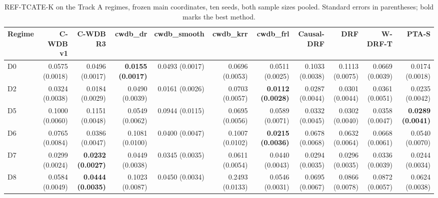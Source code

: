 \begin{table}[htbp]
\centering
\caption{REF-TCATE-K on the Track A regimes, frozen main coordinates, ten seeds, both sample sizes pooled. Standard errors in parentheses; bold marks the best method.}
\label{tab:p6-tracka-reference_tcate_rmse}
\small
\begin{tabular}{@{}lrrrrrrrrrr@{}}
\toprule
Regime & C-WDB v1 & C-WDB R3 & cwdb\_dr & cwdb\_smooth & cwdb\_krr & cwdb\_frl & Causal-DRF & DRF & W-DRF-T & PTA-S \\ 
\midrule
D0 & 0.0575 (0.0018) & 0.0496 (0.0017) & \textbf{0.0155 (0.0017)} & 0.0493 (0.0017) & 0.0696 (0.0053) & 0.0511 (0.0025) & 0.1033 (0.0038) & 0.1113 (0.0075) & 0.0669 (0.0039) & 0.0174 (0.0018) \\ 
D2 & 0.0324 (0.0038) & 0.0184 (0.0029) & 0.0490 (0.0039) & 0.0161 (0.0026) & 0.0703 (0.0057) & \textbf{0.0112 (0.0028)} & 0.0287 (0.0044) & 0.0301 (0.0044) & 0.0361 (0.0051) & 0.0235 (0.0042) \\ 
D5 & 0.1000 (0.0060) & 0.1151 (0.0048) & 0.0549 (0.0062) & 0.0944 (0.0115) & 0.0695 (0.0056) & 0.0589 (0.0071) & 0.0332 (0.0045) & 0.0302 (0.0040) & 0.0358 (0.0047) & \textbf{0.0289 (0.0041)} \\ 
D6 & 0.0765 (0.0084) & 0.0386 (0.0047) & 0.1081 (0.0100) & 0.0400 (0.0047) & 0.1007 (0.0102) & \textbf{0.0215 (0.0036)} & 0.0678 (0.0068) & 0.0632 (0.0064) & 0.0668 (0.0061) & 0.0540 (0.0070) \\ 
D7 & 0.0299 (0.0024) & \textbf{0.0232 (0.0027)} & 0.0449 (0.0038) & 0.0345 (0.0035) & 0.0611 (0.0054) & 0.0440 (0.0043) & 0.0294 (0.0035) & 0.0296 (0.0035) & 0.0336 (0.0039) & 0.0244 (0.0034) \\ 
D8 & 0.0584 (0.0049) & \textbf{0.0444 (0.0035)} & 0.1023 (0.0087) & 0.0450 (0.0034) & 0.2493 (0.0133) & 0.0546 (0.0031) & 0.0695 (0.0067) & 0.0866 (0.0078) & 0.0872 (0.0057) & 0.0624 (0.0038) \\ 
\bottomrule
\end{tabular}
\end{table}


